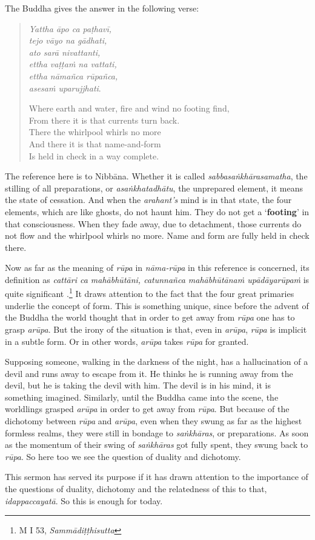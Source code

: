 The Buddha gives the answer in the following verse:

\begin{quote}
\emph{Yattha āpo ca paṭhavī,}\\
\emph{tejo vāyo na gādhati,}\\
\emph{ato sarā nivattanti,}\\
\emph{ettha vaṭṭaṁ na vattati,}\\
\emph{ettha nāmañca rūpañca,}\\
\emph{asesaṁ uparujjhati}.

Where earth and water, fire and wind no footing find,\\
From there it is that currents turn back.\\
There the whirlpool whirls no more\\
And there it is that name-and-form\\
Is held in check in a way complete.
\end{quote}

The reference here is to Nibbāna. Whether it is called \emph{sabbasaṅkhārasamatha}, the stilling of all preparations, or \emph{asaṅkhatadhātu}, the unprepared element, it means the state of cessation. And when the \emph{arahant's} mind is in that state, the four elements, which are like ghosts, do not haunt him. They do not get a `\textbf{footing}' in that consciousness. When they fade away, due to detachment, those currents do not flow and the whirlpool whirls no more. Name and form are fully held in check there.

Now as far as the meaning of \emph{rūpa} in \emph{nāma-rūpa} in this reference is concerned, its definition as \emph{cattāri ca mahābhūtāni, catunnañca mahābhūtānaṁ upādāyarūpaṁ} is quite significant .\footnote{M I 53, \emph{Sammādiṭṭhisutta}} It draws attention to the fact that the four great primaries underlie the concept of form. This is something unique, since before the advent of the Buddha the world thought that in order to get away from \emph{rūpa} one has to grasp \emph{arūpa}. But the irony of the situation is that, even in \emph{arūpa}, \emph{rūpa} is implicit in a subtle form. Or in other words, \emph{arūpa} takes \emph{rūpa} for granted.

Supposing someone, walking in the darkness of the night, has a hallucination of a devil and runs away to escape from it. He thinks he is running away from the devil, but he is taking the devil with him. The devil is in his mind, it is something imagined. Similarly, until the Buddha came into the scene, the worldlings grasped \emph{arūpa} in order to get away from \emph{rūpa}. But because of the dichotomy between \emph{rūpa} and \emph{arūpa}, even when they swung as far as the highest formless realms, they were still in bondage to \emph{saṅkhāras}, or preparations. As soon as the momentum of their swing of \emph{saṅkhāras} got fully spent, they swung back to \emph{rūpa}. So here too we see the question of duality and dichotomy.

This sermon has served its purpose if it has drawn attention to the importance of the questions of duality, dichotomy and the relatedness of this to that, \emph{idappaccayatā}. So this is enough for today.
